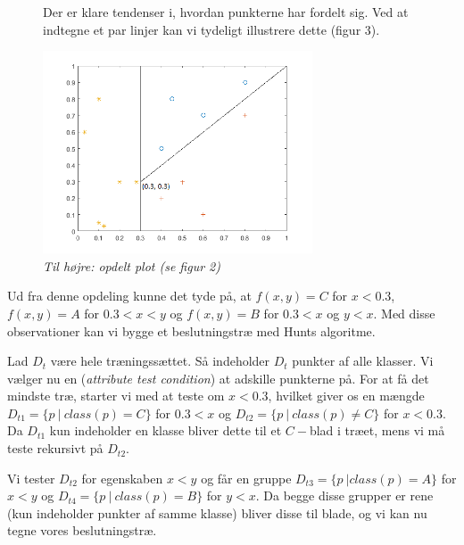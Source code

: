 \documentclass{article}
\begin{document}
\begin{figure}[H]
	\begin{minipage}[t]{0.5\linewidth}
		\begin{flushleft}
			\ \\ \ \\
			Der er klare tendenser i, hvordan punkterne har fordelt sig. Ved at indtegne et par linjer kan vi tydeligt illustrere dette (figur 3).
		\end{flushleft}
	\end{minipage}
	\begin{minipage}[t]{0.25\linewidth}
		\begin{flushright}
			\includegraphics[width=8cm]{decision_tree_example_plot_splitted}
		\end{flushright}
	\end{minipage}
	\caption{\textit{Til højre: opdelt plot (se figur 2)}}
\end{figure}



Ud fra denne opdeling kunne det tyde på, at $f(x,y)=C$ for $x<0.3$, $f(x,y)=A$ for $0.3<x<y$ og $f(x,y)=B$ for $0.3<x$ og $y<x$. Med disse observationer kan vi bygge et beslutningstræ med Hunts algoritme.

Lad $D_t$ være hele træningssættet. Så indeholder $D_t$ punkter af alle klasser. Vi vælger nu en (\textit{attribute test condition}) at adskille punkterne på. For at få det mindste træ, starter vi med at teste om $x<0.3$, hvilket giver os en mængde $D_{t1}=\{p\ |\ class(p)=C\}$ for $0.3<x$ og $D_{t2}=\{p\ |\ class(p)\neq C\}$ for $x<0.3$. Da $D_{t1}$ kun indeholder en klasse bliver dette til et $C-$blad i træet, mens vi må teste rekursivt på $D_{t2}$.

Vi tester $D_{t2}$ for egenskaben $x<y$ og får en gruppe $D_{t3}=\{p\ | class(p)=A\}$ for $x<y$ og $D_{t4}=\{p\ |\ class(p)=B\}$ for $y<x$. Da begge disse grupper er rene (kun indeholder punkter af samme klasse) bliver disse til blade, og vi kan nu tegne vores beslutningstræ.
\end{document}
